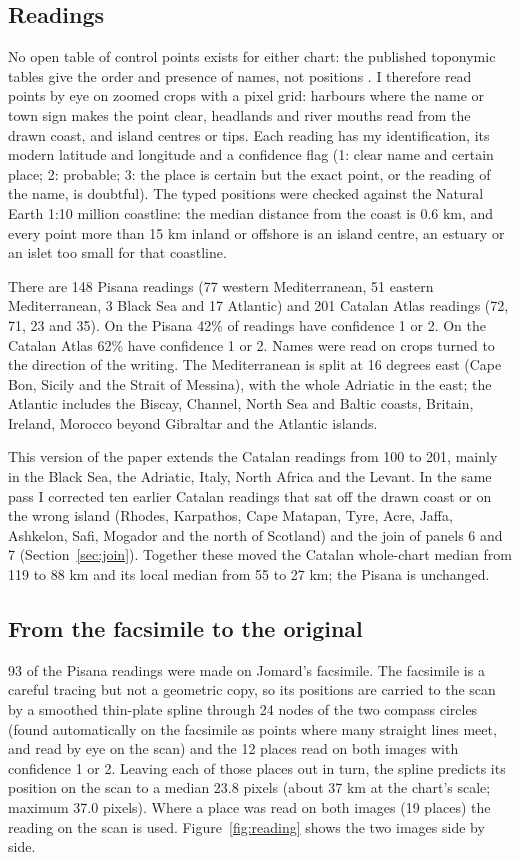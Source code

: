 \documentclass[11pt,a4paper]{article}
\begin{document}
\subsection{Readings}
No open table of control points exists for either chart: the published toponymic tables give the order and presence of names, not positions \citep{campbell1987,pujades2007}. I therefore read points by eye on zoomed crops with a pixel grid: harbours where the name or town sign makes the point clear, headlands and river mouths read from the drawn coast, and island centres or tips. Each reading has my identification, its modern latitude and longitude and a confidence flag (1: clear name and certain place; 2: probable; 3: the place is certain but the exact point, or the reading of the name, is doubtful). The typed positions were checked against the Natural Earth 1:10 million coastline: the median distance from the coast is 0.6 km, and every point more than 15 km inland or offshore is an island centre, an estuary or an islet too small for that coastline.

There are 148 Pisana readings (77 western Mediterranean, 51 eastern Mediterranean, 3 Black Sea and 17 Atlantic) and 201 Catalan Atlas readings (72, 71, 23 and 35). On the Pisana 42\% of readings have confidence 1 or 2. On the Catalan Atlas 62\% have confidence 1 or 2. Names were read on crops turned to the direction of the writing. The Mediterranean is split at 16 degrees east (Cape Bon, Sicily and the Strait of Messina), with the whole Adriatic in the east; the Atlantic includes the Biscay, Channel, North Sea and Baltic coasts, Britain, Ireland, Morocco beyond Gibraltar and the Atlantic islands.

This version of the paper extends the Catalan readings from 100 to 201, mainly in the Black Sea, the Adriatic, Italy, North Africa and the Levant. In the same pass I corrected ten earlier Catalan readings that sat off the drawn coast or on the wrong island (Rhodes, Karpathos, Cape Matapan, Tyre, Acre, Jaffa, Ashkelon, Safi, Mogador and the north of Scotland) and the join of panels 6 and 7 (Section~\ref{sec:join}). Together these moved the Catalan whole-chart median from 119 to 88 km and its local median from 55 to 27 km; the Pisana is unchanged.

\subsection{From the facsimile to the original}\label{sec:transfer}
93 of the Pisana readings were made on Jomard's facsimile. The facsimile is a careful tracing but not a geometric copy, so its positions are carried to the scan by a smoothed thin-plate spline through 24 nodes of the two compass circles (found automatically on the facsimile as points where many straight lines meet, and read by eye on the scan) and the 12 places read on both images with confidence 1 or 2. Leaving each of those places out in turn, the spline predicts its position on the scan to a median 23.8 pixels (about 37 km at the chart's scale; maximum 37.0 pixels). Where a place was read on both images (19 places) the reading on the scan is used. Figure~\ref{fig:reading} shows the two images side by side.
\end{document}
